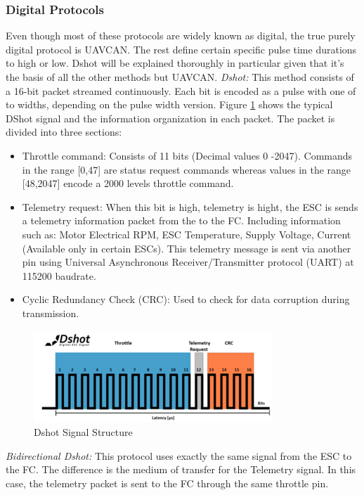 \subsubsection{Digital Protocols} \label{sec: esc_dig_prot}
Even though most of these protocols are widely known as digital, the true purely digital protocol is UAVCAN. The rest define certain specific pulse time durations to high or low. Dshot will be explained thoroughly in particular given that it's the basis of all the other methods but UAVCAN.
\newline
\textit{Dshot: } This method consists of a 16-bit packet streamed continuously. Each bit is encoded as a pulse with one of to widths, depending on the pulse width version. Figure \ref{fig:dshot} shows the typical DShot signal and the information organization in each packet. The packet is divided into three sections: 
\begin{itemize}
    \item Throttle command: Consists of 11 bits (Decimal values 0 -2047). Commands in the range [0,47] are status request commands whereas values in the range [48,2047] encode a 2000 levels throttle command.
    \item Telemetry request: When this bit is high, telemetry is hight, the ESC is sends a telemetry information packet from the to the FC. Including information such as: Motor Electrical RPM, ESC Temperature, Supply Voltage, Current (Available only in certain ESCs). This telemetry message is sent via another pin using Universal Asynchronous Receiver/Transmitter protocol (UART) at 115200 baudrate.
    \item Cyclic Redundancy Check (CRC): Used to check for data corruption during transmission.
\end{itemize}

\begin{figure}
    \centering
    \includegraphics[width=0.8\textwidth]{images/dshot_sketch.png}
    \caption{Dshot Signal Structure \cite{Speedgoat2020}}
    \label{fig:dshot}
\end{figure}

\textit{Bidirectional Dshot:} This protocol uses exactly the same signal from the ESC to the FC. The difference is the medium of transfer for the Telemetry signal. In this case, the telemetry packet is sent to the FC through the same throttle pin.
\newline

